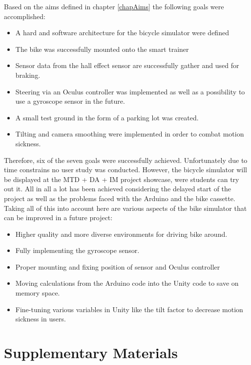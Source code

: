 \documentclass[english,notitlepage,smartquotes]{hgbreport}
\begin{document}
Based on the aims defined in chapter \ref{chapAims} the following goals were accomplished:
\begin{itemize}
	\item A hard and software architecture for the bicycle simulator were defined
	\item The bike was successfully mounted onto the smart trainer
	\item Sensor data from the hall effect sensor are successfully gather and used for braking. 
	\item Steering via an Oculus controller was implemented as well as a possibility to use a gyroscope sensor in the future.
	\item A small test ground in the form of a parking lot was created.
	\item Tilting and camera smoothing were implemented in order to combat motion sickness.
\end{itemize}
Therefore, six of the seven goals were successfully achieved. 
Unfortunately due to time constrains no user study was conducted. 
However, the bicycle simulator will be displayed at the MTD + DA + IM project showcase, were students can try out it.
All in all a lot has been achieved considering the delayed start of the project as well as the problems faced with the Arduino and the bike cassette.
Taking all of this into account here are various aspects of the bike simulator that can be improved in a future project:
\begin{itemize}
	\item Higher quality and more diverse environments for driving bike around.
	\item Fully implementing the gyroscope sensor.
	\item Proper mounting and fixing position of sensor and Oculus controller
	\item Moving calculations from the Arduino code into the Unity code to save on memory space.
	\item Fine-tuning various variables in Unity like the tilt factor to decrease motion sickness in users.
\end{itemize}

\appendix                                                   %

\chapter{Supplementary Materials}



\MakeBibliography[nosplit]

\end{document}
